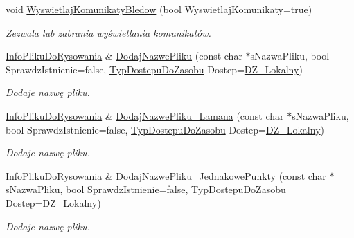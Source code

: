 \begin{DoxyCompactItemize}
void \mbox{\hyperlink{class_pz_g_1_1_lacze_do_g_n_u_plota_a409f4f4ba52b2b246d5695daef12167d}{Wyswietlaj\+Komunikaty\+Bledow}} (bool Wyswietlaj\+Komunikaty=true)
\begin{DoxyCompactList}\small\item\em Zezwala lub zabrania wyświetlania komunikatów. \end{DoxyCompactList}\item 
\mbox{\hyperlink{class_pz_g_1_1_info_pliku_do_rysowania}{Info\+Pliku\+Do\+Rysowania}} \& \mbox{\hyperlink{class_pz_g_1_1_lacze_do_g_n_u_plota_aa815ce8ec16e12fc246cf422e562869e}{Dodaj\+Nazwe\+Pliku}} (const char $\ast$s\+Nazwa\+Pliku, bool Sprawdz\+Istnienie=false, \mbox{\hyperlink{namespace_pz_g_af74528dea7061dcb07cf44f315703cf4}{Typ\+Dostepu\+Do\+Zasobu}} Dostep=\mbox{\hyperlink{namespace_pz_g_af74528dea7061dcb07cf44f315703cf4ab239a07233614b519b0f2f5ca8af7826}{D\+Z\+\_\+\+Lokalny}})
\begin{DoxyCompactList}\small\item\em Dodaje nazwę pliku. \end{DoxyCompactList}\item 
\mbox{\hyperlink{class_pz_g_1_1_info_pliku_do_rysowania}{Info\+Pliku\+Do\+Rysowania}} \& \mbox{\hyperlink{class_pz_g_1_1_lacze_do_g_n_u_plota_a5d53870de4161dd855b327b3f5d1df9c}{Dodaj\+Nazwe\+Pliku\+\_\+\+Lamana}} (const char $\ast$s\+Nazwa\+Pliku, bool Sprawdz\+Istnienie=false, \mbox{\hyperlink{namespace_pz_g_af74528dea7061dcb07cf44f315703cf4}{Typ\+Dostepu\+Do\+Zasobu}} Dostep=\mbox{\hyperlink{namespace_pz_g_af74528dea7061dcb07cf44f315703cf4ab239a07233614b519b0f2f5ca8af7826}{D\+Z\+\_\+\+Lokalny}})
\begin{DoxyCompactList}\small\item\em Dodaje nazwę pliku. \end{DoxyCompactList}\item 
\mbox{\hyperlink{class_pz_g_1_1_info_pliku_do_rysowania}{Info\+Pliku\+Do\+Rysowania}} \& \mbox{\hyperlink{class_pz_g_1_1_lacze_do_g_n_u_plota_ab3286408bb2ca5c5382e721b40d07f4f}{Dodaj\+Nazwe\+Pliku\+\_\+\+Jednakowe\+Punkty}} (const char $\ast$s\+Nazwa\+Pliku, bool Sprawdz\+Istnienie=false, \mbox{\hyperlink{namespace_pz_g_af74528dea7061dcb07cf44f315703cf4}{Typ\+Dostepu\+Do\+Zasobu}} Dostep=\mbox{\hyperlink{namespace_pz_g_af74528dea7061dcb07cf44f315703cf4ab239a07233614b519b0f2f5ca8af7826}{D\+Z\+\_\+\+Lokalny}})
\begin{DoxyCompactList}\small\item\em Dodaje nazwę pliku. \end{DoxyCompactList}\item 

\end{DoxyCompactItemize}
